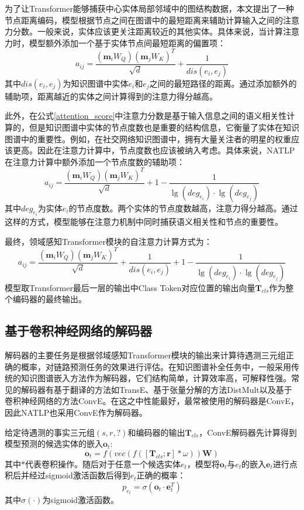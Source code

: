 为了让Transformer能够捕获中心实体局部邻域中的图结构数据，本文提出了一种节点距离编码，模型根据节点之间在图谱中的最短距离来辅助计算输入之间的注意力分数。一般来说，实体应该更关注距离较近的其他实体。具体来说，当计算注意力时，模型额外添加一个基于实体节点间最短距离的偏置项：
\begin{equation}
  a_{ij}=\frac{(\boldsymbol{m}_iW_Q)(\boldsymbol{m}_jW_K)^T}{\sqrt{d}}+\frac{1}{dis(e_i,e_j)}
\end{equation}
其中$dis(e_i,e_j)$为知识图谱中实体$e_i$和$e_j$之间的最短路径的距离。通过添加额外的辅助项，距离越近的实体之间计算得到的注意力得分越高。

此外，在公式\ref{attention_score}中注意力分数是基于输入信息之间的语义相关性计算的，但是知识图谱中实体的节点度数也是重要的结构信息，它衡量了实体在知识图谱中的重要性。例如，在社交网络知识图谱中，拥有大量关注者的明星的权重应该更高。因此在注意力计算中，节点度数也应该被纳入考虑。具体来说，NATLP在注意力计算中额外添加一个节点度数的辅助项：
\begin{equation}
  a_{ij}=\frac{(\boldsymbol{m}_iW_Q)(\boldsymbol{m}_jW_K)^T}{\sqrt{d}}+1-\frac{1}{\lg (deg_{e_i})\cdot \lg (deg_{e_j})}
\end{equation}
其中$deg_{e_i}$为实体$e_i$的节点度数。两个实体的节点度数越高，注意力得分越高。通过这样的方式，模型能够在注意力机制中同时捕获语义相关性和节点的重要性。

最终，领域感知Transformer模块的自注意力计算方式为：
\begin{equation}
  a_{ij}=\frac{(\boldsymbol{m}_iW_Q)(\boldsymbol{m}_jW_K)^T}{\sqrt{d}}+\frac{1}{dis(e_i,e_j)}+1-\frac{1}{\lg (deg_{e_i})\cdot \lg (deg_{e_j})}
\end{equation}
模型取Transformer最后一层的输出中Class Token对应位置的输出向量$\boldsymbol{T}_{cls}$作为整个编码器的最终输出。


\subsection{基于卷积神经网络的解码器}

解码器的主要任务是根据邻域感知Transformer模块的输出来计算待遇测三元组正确的概率，对链路预测任务的效果进行评估。在知识图谱补全任务中，一般采用传统的知识图谱嵌入方法作为解码器，它们结构简单，计算效率高，可解释性强。常见的解码器有基于翻译的方法如TransE、基于张量分解的方法DistMult以及基于卷积神经网络的方法ConvE。在这之中性能最好，最常被使用的解码器是ConvE，因此NATLP也采用ConvE作为解码器。

给定待遇测的事实三元组$(s,r,?)$和编码器的输出$\boldsymbol{T}_{cls}$，ConvE解码器先计算得到模型预测的候选实体的嵌入$\boldsymbol{o}_{t}$:
\begin{equation}
  \boldsymbol{o}_{t}=f\left(vec\left(f\left(\left[\boldsymbol{T}_{cls};\boldsymbol{r}\right]\ast \omega\right)\right)\mathbf{W}\right)
\end{equation}
其中$\ast$代表卷积操作。随后对于任意一个候选实体$e_t$，模型将$\boldsymbol{o}_{t}$与$e_t$的嵌入$\boldsymbol{e}_{t}$进行点积后并经过sigmoid激活函数后得到$e_t$正确的概率：
\begin{equation}
  p_{e_t} = \sigma(\boldsymbol{o}_{t}\cdot \boldsymbol{e}_{t}^T)
\end{equation}
其中$\sigma(\cdot)$为sigmoid激活函数。

